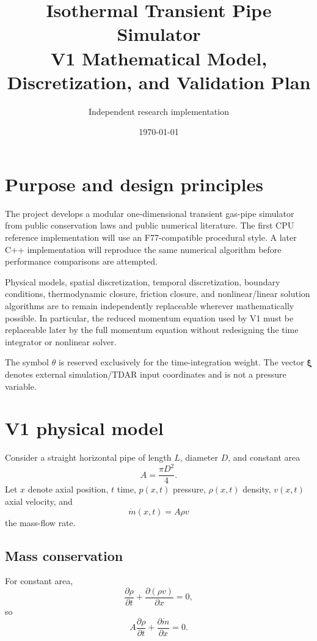 \documentclass[11pt]{article}
\title{Isothermal Transient Pipe Simulator\\\large V1 Mathematical Model, Discretization, and Validation Plan}
\author{Independent research implementation}
\date{\today}
\newcommand{\mdot}{\dot m}
\begin{document}
\maketitle
\tableofcontents

\section{Purpose and design principles}
The project develops a modular one-dimensional transient gas-pipe simulator from public conservation laws and public numerical literature. The first CPU reference implementation will use an F77-compatible procedural style. A later C++ implementation will reproduce the same numerical algorithm before performance comparisons are attempted.

Physical models, spatial discretization, temporal discretization, boundary conditions, thermodynamic closure, friction closure, and nonlinear/linear solution algorithms are to remain independently replaceable wherever mathematically possible. In particular, the reduced momentum equation used by V1 must be replaceable later by the full momentum equation without redesigning the time integrator or nonlinear solver.

The symbol $\theta$ is reserved exclusively for the time-integration weight. The vector $\bm{\xi}$ denotes external simulation/TDAR input coordinates and is not a pressure variable.

\section{V1 physical model}
Consider a straight horizontal pipe of length $L$, diameter $D$, and constant area
\begin{equation}
A=\frac{\pi D^2}{4}.
\end{equation}
Let $x$ denote axial position, $t$ time, $p(x,t)$ pressure, $\rho(x,t)$ density, $v(x,t)$ axial velocity, and
\begin{equation}
\mdot(x,t)=A\rho v
\end{equation}
the mass-flow rate.

\subsection{Mass conservation}
For constant area,
\begin{equation}
\frac{\partial \rho}{\partial t}+\frac{\partial(\rho v)}{\partial x}=0,
\end{equation}
so
\begin{equation}
\boxed{A\frac{\partial \rho}{\partial t}+\frac{\partial\mdot}{\partial x}=0.}
\label{eq:mass}
\end{equation}
\end{document}
